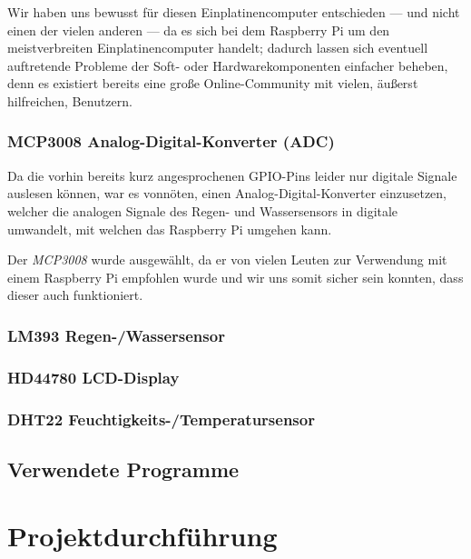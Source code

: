 \documentclass[a4paper,12pt]{article}
\begin{document}
Wir haben uns bewusst für diesen Einplatinencomputer entschieden — und nicht einen der vielen anderen — da es sich bei dem Raspberry Pi um den meistverbreiten Einplatinencomputer handelt; dadurch lassen sich eventuell auftretende Probleme der Soft- oder Hardwarekomponenten einfacher beheben, denn es existiert bereits eine große Online-Community mit vielen, äußerst hilfreichen, Benutzern.

\subsubsection{MCP3008 Analog-Digital-Konverter (ADC)}
Da die vorhin bereits kurz angesprochenen GPIO-Pins leider nur digitale Signale auslesen können, war es vonnöten, einen Analog-Digital-Konverter einzusetzen, welcher die analogen Signale des Regen- und Wassersensors in digitale umwandelt, mit welchen das Raspberry Pi umgehen kann.

Der \textit{MCP3008} wurde ausgewählt, da er von vielen Leuten zur Verwendung mit einem Raspberry Pi empfohlen wurde und wir uns somit sicher sein konnten, dass dieser auch funktioniert.

\subsubsection{LM393 Regen-/Wassersensor}
\subsubsection{HD44780 LCD-Display}
\subsubsection{DHT22 Feuchtigkeits-/Temperatursensor}

\pagebreak

\subsection{Verwendete Programme}
\pagebreak

\section{Projektdurchführung}
\end{document}
